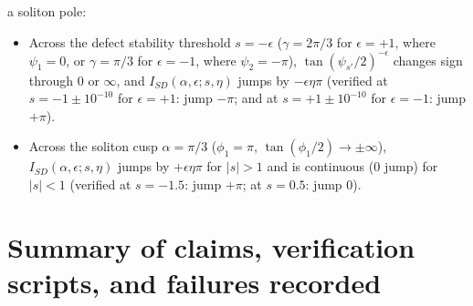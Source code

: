 \documentclass[11pt,a4paper]{article}
\begin{document}
\begin{enumerate}
a soliton pole:
\begin{itemize}
\item Across the defect stability threshold $s = -\epsilon$ ($\gamma = 2\pi/3$ for
$\epsilon=+1$, where $\psi_1=0$, or $\gamma = \pi/3$ for $\epsilon=-1$, where
$\psi_2 = -\pi$), $\tan(\psi_{s'}/2)^{-\epsilon}$ changes sign through $0$ or $\infty$,
and $I_{SD}(\alpha,\epsilon;s,\eta)$ jumps by $-\epsilon\eta\pi$ (verified at
$s = -1\pm 10^{-10}$ for $\epsilon=+1$: jump $-\pi$; and at $s = +1\pm 10^{-10}$
for $\epsilon=-1$: jump $+\pi$).
\item Across the soliton cusp $\alpha = \pi/3$ ($\phi_1 = \pi$, $\tan(\phi_1/2) \to \pm\infty$),
$I_{SD}(\alpha,\epsilon;s,\eta)$ jumps by $+\epsilon\eta\pi$ for $|s|>1$ and is
continuous ($0$ jump) for $|s|<1$ (verified at $s=-1.5$: jump $+\pi$; at $s=0.5$:
jump $0$).
\end{itemize}
\end{enumerate}

\section{Summary of claims, verification scripts, and failures recorded}
\label{sec:summary}
\end{document}
